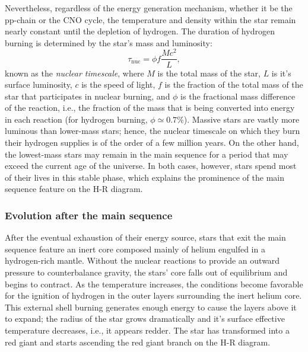 \documentclass[main.tex]{subfiles}
\begin{document}
    Nevertheless, regardless of the energy generation mechanism, whether it be the pp-chain or the CNO cycle, the temperature and density within the star remain nearly constant until the depletion of hydrogen. The duration of hydrogen burning is determined by the star's mass and luminosity:
    \begin{equation}
        \label{eq:nuclear_timescale}
        \tau_\mathrm{nuc} = \phi f \frac{Mc^2}{L},
    \end{equation}
    known as the \textit{nuclear timescale}, where $M$ is the total mass of the star, $L$ is it's surface luminosity, $c$ is the speed of light, $f$ is the fraction of the total mass of the star that participates in nuclear burning, and $\phi$ is the fractional mass difference of the reaction, i.e., the fraction of the mass that is being converted into energy in each reaction (for hydrogen burning, $\phi \simeq 0.7\%$). Massive stars are vastly more luminous than lower-mass stars; hence, the nuclear timescale on which they burn their hydrogen supplies is of the order of a few million years. On the other hand, the lowest-mass stars may remain in the main sequence for a period that may exceed the current age of the universe. In both cases, however, stars spend most of their lives in this stable phase, which explains the prominence of the main sequence feature on the H-R diagram.

    \subsubsection{Evolution after the main sequence}
    After the eventual exhaustion of their energy source, stars that exit the main sequence feature an inert core composed mainly of helium engulfed in a hydrogen-rich mantle. Without the nuclear reactions to provide an outward pressure to counterbalance gravity, the stars' core falls out of equilibrium and begins to contract. As the temperature increases, the conditions become favorable for the ignition of hydrogen in the outer layers surrounding the inert helium core. This external shell burning generates enough energy to cause the layers above it to expand; the radius of the star grows dramatically and it's surface effective temperature decreases, i.e., it appears redder. The star has transformed into a red giant and starts ascending the red giant branch on the H-R diagram.
\end{document}
